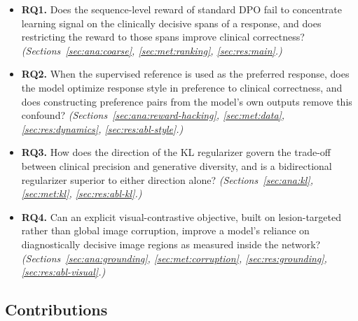 \begin{itemize}
    \item \textbf{RQ1.} Does the sequence-level reward of standard DPO fail to concentrate learning signal on the clinically decisive spans of a response, and does restricting the reward to those spans improve clinical correctness? \emph{(Sections~\ref{sec:ana:coarse}, \ref{sec:met:ranking}, \ref{sec:res:main}.)}

    \item \textbf{RQ2.} When the supervised reference is used as the preferred response, does the model optimize response style in preference to clinical correctness, and does constructing preference pairs from the model's own outputs remove this confound? \emph{(Sections~\ref{sec:ana:reward-hacking}, \ref{sec:met:data}, \ref{sec:res:dynamics}, \ref{sec:res:abl-style}.)}

    \item \textbf{RQ3.} How does the direction of the KL regularizer govern the trade-off between clinical precision and generative diversity, and is a bidirectional regularizer superior to either direction alone? \emph{(Sections~\ref{sec:ana:kl}, \ref{sec:met:kl}, \ref{sec:res:abl-kl}.)}

    \item \textbf{RQ4.} Can an explicit visual-contrastive objective, built on lesion-targeted rather than global image corruption, improve a model's reliance on diagnostically decisive image regions as measured inside the network? \emph{(Sections~\ref{sec:ana:grounding}, \ref{sec:met:corruption}, \ref{sec:res:grounding}, \ref{sec:res:abl-visual}.)}
\end{itemize}

\subsection{Contributions}
\label{sec:intro:contributions}

